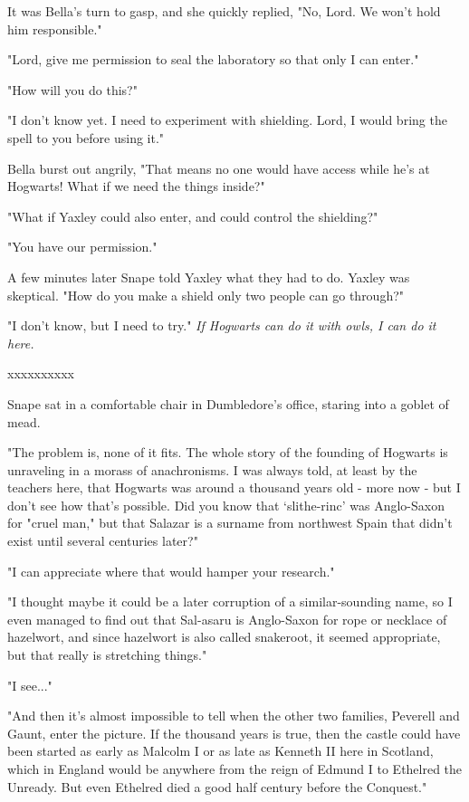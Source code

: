 \documentclass[a4paper,11pt]{article}
\begin{document}
It was Bella's turn to gasp, and she quickly replied, "No, Lord. We won't hold him responsible."

"Lord, give me permission to seal the laboratory so that only I can enter."

"How will you do this?"

"I don't know yet. I need to experiment with shielding. Lord, I would bring the spell to you before using it."

Bella burst out angrily, "That means no one would have access while he's at Hogwarts! What if we need the things inside?"

"What if Yaxley could also enter, and could control the shielding?"

"You have our permission."

A few minutes later Snape told Yaxley what they had to do. Yaxley was skeptical. "How do you make a shield only two people can go through?"

"I don't know, but I need to try." \emph{If Hogwarts can do it with owls, I can do it here.}

xxxxxxxxxx

Snape sat in a comfortable chair in Dumbledore's office, staring into a goblet of mead.

"The problem is, none of it fits. The whole story of the founding of Hogwarts is unraveling in a morass of anachronisms. I was always told, at least by the teachers here, that Hogwarts was around a thousand years old - more now - but I don't see how that's possible. Did you know that `slithe-rinc' was Anglo-Saxon for "cruel man," but that Salazar is a surname from northwest Spain that didn't exist until several centuries later?"

"I can appreciate where that would hamper your research."

"I thought maybe it could be a later corruption of a similar-sounding name, so I even managed to find out that Sal-asaru is Anglo-Saxon for rope or necklace of hazelwort, and since hazelwort is also called snakeroot, it seemed appropriate, but that really is stretching things."

"I see..."

"And then it's almost impossible to tell when the other two families, Peverell and Gaunt, enter the picture. If the thousand years is true, then the castle could have been started as early as Malcolm I or as late as Kenneth II here in Scotland, which in England would be anywhere from the reign of Edmund I to Ethelred the Unready. But even Ethelred died a good half century before the Conquest."
\end{document}
